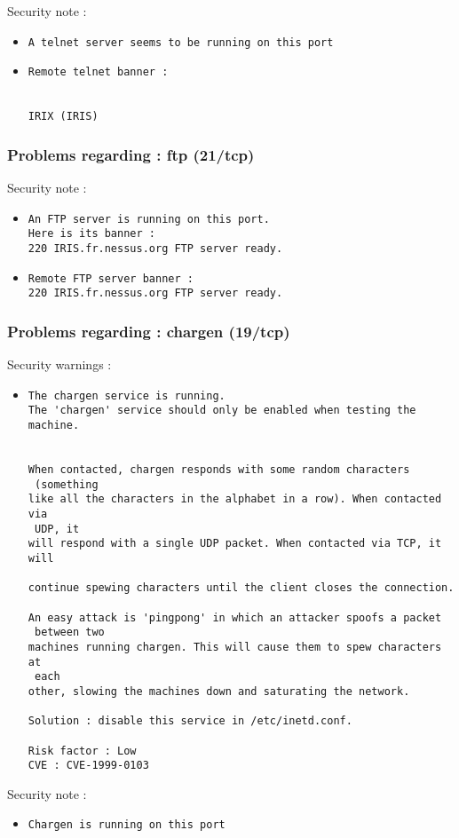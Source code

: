 \documentclass{article}
\begin{document}
Security note :\\
\begin{itemize}
\item \begin{verbatim}
A telnet server seems to be running on this port
\end{verbatim}\item \begin{verbatim}
Remote telnet banner :


IRIX (IRIS)

\end{verbatim}\end{itemize}
\subsubsection{Problems regarding : ftp (21/tcp)}
Security note :\\
\begin{itemize}
\item \begin{verbatim}
An FTP server is running on this port.
Here is its banner : 
220 IRIS.fr.nessus.org FTP server ready.
\end{verbatim}\item \begin{verbatim}
Remote FTP server banner :
220 IRIS.fr.nessus.org FTP server ready.
\end{verbatim}\end{itemize}
\subsubsection{Problems regarding : chargen (19/tcp)}
Security warnings :\\
\begin{itemize}
\item \begin{verbatim}
The chargen service is running.
The 'chargen' service should only be enabled when testing the machine.
 

When contacted, chargen responds with some random characters
 (something
like all the characters in the alphabet in a row). When contacted via
 UDP, it 
will respond with a single UDP packet. When contacted via TCP, it will
 
continue spewing characters until the client closes the connection. 

An easy attack is 'pingpong' in which an attacker spoofs a packet
 between two
machines running chargen. This will cause them to spew characters at
 each 
other, slowing the machines down and saturating the network.
      
Solution : disable this service in /etc/inetd.conf.

Risk factor : Low
CVE : CVE-1999-0103
\end{verbatim}\end{itemize}
Security note :\\
\begin{itemize}
\item \begin{verbatim}
Chargen is running on this port
\end{verbatim}\end{itemize}
\end{document}
